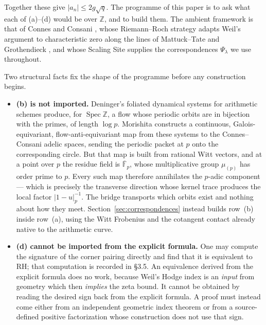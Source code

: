 \documentclass[11pt]{amsart}
\theoremstyle{definition}
\theoremstyle{remark}
\newcommand{\Z}{\mathbb Z}
\newcommand{\RH}{\mathrm{RH}}
\newcommand{\Spec}{\operatorname{Spec}}
\begin{document}
Together these give $|a_n|\le 2g\sqrt q$.  The programme of this paper is to
ask what each of (a)--(d) would be over $\Z$, and to build them.  The
ambient framework is that of Connes and Consani
\cite{CC-ArithmeticSite,CC-ScalingSite,CC-RRstrategy,CC-RRSpecZ}, whose
Riemann--Roch strategy adapts Weil's argument to characteristic zero along
the lines of Mattuck--Tate and Grothendieck
\cite{MattuckTate,Grothendieck}, and whose Scaling Site supplies the
correspondences $\Psi_\lambda$ we use throughout.

Two structural facts fix the shape of the programme before any construction
begins.

\begin{itemize}
\item \textbf{(b) is not imported.}  Deninger's foliated
dynamical systems for arithmetic schemes \cite{Deninger2024} produce, for
$\Spec\Z$, a flow whose periodic orbits are in bijection with the primes,
of length $\log p$.  Morishita \cite{Morishita2026} constructs a continuous,
Galois-equivariant, flow-anti-equivariant map from these systems to the
Connes--Consani adelic spaces, sending the periodic packet at $p$ onto the
corresponding circle.  But that map is built from rational Witt vectors, and
at a point over $p$ the residue field is $\overline{\mathbb F}_p$, whose
multiplicative group $\mu_{(p)}$ has order prime to $p$.  Every such map
therefore annihilates the $p$-adic component --- which is precisely the
transverse direction whose kernel trace produces the local factor
$|1-u|_p^{-1}$.  The bridge transports which orbits exist and nothing about
how they meet.  Section~\ref{sec:correspondences} instead builds row~(b)
inside row~(a), using the Witt Frobenius and the cotangent contact already
native to the arithmetic curve.

\item \textbf{(d) cannot be imported from the explicit formula.}  One may
compute the signature of the corner pairing directly and find that it is
equivalent to $\RH$; that computation is recorded in \S3.5.  An equivalence
derived from the explicit formula does no work, because Weil's Hodge index
is an \emph{input} from geometry which then \emph{implies} the zeta bound.
It cannot be obtained by reading the desired sign back from the explicit
formula.  A proof must instead come either from an independent geometric
index theorem or from a source-defined positive factorization whose
construction does not use that sign.
\end{itemize}
\end{document}

